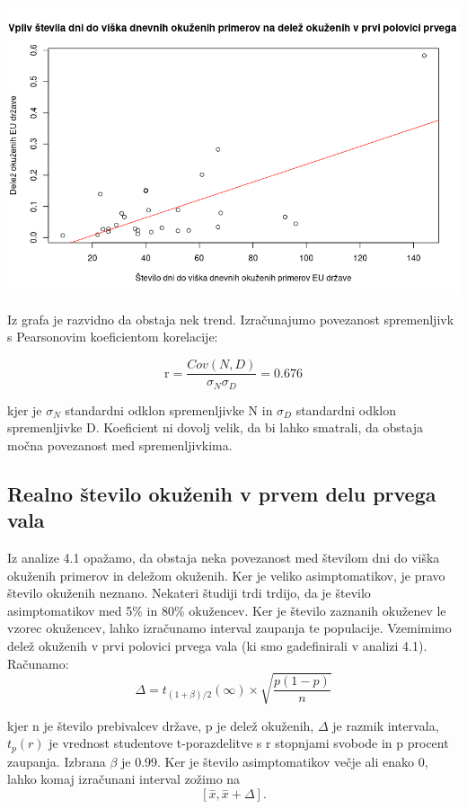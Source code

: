 \documentclass[a4paper,11pt]{article}
\begin{document}
\includegraphics[scale=0.6]{Vpliv_stevila_dni_do_viska_dnevnih_okuzenih_primerov_na_delez_okuzenih_v_prvi_polovici_prvega_vala}

Iz grafa je razvidno da obstaja nek trend. Izračunajumo povezanost spremenljivk s Pearsonovim koeficientom korelacije:

\begin{center}
\[\text{r} = \frac{Cov(N,D)}{\sigma_{N} \sigma_{D}} = 0.676\]
\end{center} 
kjer je \(\sigma_{N}\) standardni odklon spremenljivke N in \(\sigma_{D}\) standardni odklon spremenljivke D. Koeficient ni dovolj velik, da bi lahko smatrali, da obstaja močna povezanost med spremenljivkima.

\subsection{Realno število okuženih v prvem delu prvega vala}
Iz analize 4.1 opažamo, da obstaja neka povezanost med številom dni do viška okuženih primerov in deležom okuženih. Ker je veliko asimptomatikov, je pravo število okuženih neznano. Nekateri študiji \cite{asycvd19} trdi trdijo, da je število asimptomatikov med 5\% in 80\% okužencev. Ker je število zaznanih okuženev le vzorec okužencev, lahko izračunamo interval zaupanja te populacije. Vzemimimo delež okuženih v prvi polovici prvega vala (ki smo gadefinirali v analizi 4.1). Računamo:
\[\Delta = t_{(1 + \beta) /2}(\infty) \times \sqrt{\frac{p(1 - p)}{n}}\]

kjer n je število prebivalcev države, p je delež okuženih, \(\Delta\) je razmik intervala, \(t_{p}(r)\) je vrednost studentove t-porazdelitve s r stopnjami svobode in p procent zaupanja. Izbrana \(\beta\) je 0.99. Ker je število asimptomatikov večje ali enako 0, lahko komaj izračunani interval zožimo na
\[[\overset{-}{x}, \overset{-}{x} + \Delta ]\text{.}\]
\end{document}
